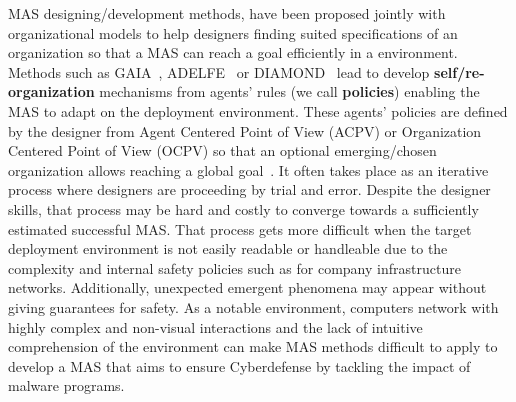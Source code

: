 \documentclass[runningheads]{llncs}
\begin{document}
MAS designing/development methods, have been proposed jointly with organizational models to help designers finding suited specifications of an organization so that a MAS can reach a goal efficiently in a environment. Methods such as GAIA~\cite{Wooldridge2000}, ADELFE~\cite{Bernon2003} or DIAMOND~\cite{Jamont2005} lead to develop \textbf{self/re-organization} mechanisms from agents' rules (we call \textbf{policies}) enabling the MAS to adapt on the deployment environment.
These agents' policies are defined by the designer from Agent Centered Point of View (ACPV) or
Organization Centered Point of View (OCPV) so that an optional emerging/chosen organization allows reaching a global goal~\cite{Picard2009}. It often takes place as an iterative process where designers are proceeding by trial and error. Despite the designer skills, that process may be hard and costly to converge towards a sufficiently estimated successful MAS. That process gets more difficult when the target deployment environment is not easily readable or handleable due to the complexity and internal safety policies such as for company infrastructure networks. Additionally, unexpected emergent phenomena may appear without giving guarantees for safety.
As a notable environment, computers network with highly complex and non-visual interactions and the lack of intuitive comprehension of the environment can make MAS methods difficult to apply to develop a MAS that aims to ensure Cyberdefense by tackling the impact of malware programs.


\end{document}
